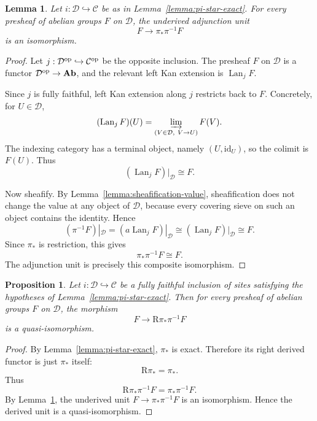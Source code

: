 \documentclass{article}
\newtheorem{lemma}[theorem]{Lemma}
\newtheorem{proposition}[theorem]{Proposition}
\theoremstyle{remark}
\begin{document}
\begin{lemma}\label{lemma:underived-unit}
Let \(i:\mathcal D\hookrightarrow \mathcal C\) be as in
Lemma~\ref{lemma:pi-star-exact}.  For every presheaf of abelian groups
\(F\) on \(\mathcal D\), the underived adjunction unit
\[
F\longrightarrow \pi_\ast\pi^{-1}F
\]
is an isomorphism.
\end{lemma}

\begin{proof}
Let \(j:\mathcal D^{\rm op}\hookrightarrow \mathcal C^{\rm op}\) be the
opposite inclusion.  The presheaf \(F\) on \(\mathcal D\) is a functor
\(\mathcal D^{\rm op}\to\mathbf{Ab}\), and the relevant left Kan
extension is \(\operatorname{Lan}_j F\).

Since \(j\) is fully faithful, left Kan extension along \(j\) restricts
back to \(F\).  Concretely, for \(U\in\mathcal D\),
\[
(\operatorname{Lan}_jF)(U)
=
\varinjlim_{(V\in\mathcal D,\ V\to U)} F(V).
\]
The indexing category has a terminal object, namely
\((U,\mathrm{id}_U)\), so the colimit is \(F(U)\).  Thus
\[
(\operatorname{Lan}_jF)|_{\mathcal D}\cong F.
\]

Now sheafify.  By Lemma~\ref{lemma:sheafification-value}, sheafification
does not change the value at any object of \(\mathcal D\), because every
covering sieve on such an object contains the identity.  Hence
\[
(\pi^{-1}F)|_{\mathcal D}
=
(a\operatorname{Lan}_jF)|_{\mathcal D}
\cong
(\operatorname{Lan}_jF)|_{\mathcal D}
\cong
F.
\]
Since \(\pi_\ast\) is restriction, this gives
\[
\pi_\ast\pi^{-1}F\cong F.
\]
The adjunction unit is precisely this composite isomorphism.
\end{proof}

\begin{proposition}\label{prop:general}
Let \(i:\mathcal D\hookrightarrow \mathcal C\) be a fully faithful
inclusion of sites satisfying the hypotheses of
Lemma~\ref{lemma:pi-star-exact}.  Then for every presheaf of abelian
groups \(F\) on \(\mathcal D\), the morphism
\[
F\longrightarrow \mathrm R\pi_\ast\pi^{-1}F
\]
is a quasi-isomorphism.
\end{proposition}

\begin{proof}
By Lemma~\ref{lemma:pi-star-exact}, \(\pi_\ast\) is exact.  Therefore
its right derived functor is just \(\pi_\ast\) itself:
\[
\mathrm R\pi_\ast=\pi_\ast.
\]
Thus
\[
\mathrm R\pi_\ast\pi^{-1}F
=
\pi_\ast\pi^{-1}F.
\]
By Lemma~\ref{lemma:underived-unit}, the underived unit
\(F\to\pi_\ast\pi^{-1}F\) is an isomorphism.  Hence the derived unit is
a quasi-isomorphism.
\end{proof}
\end{document}

